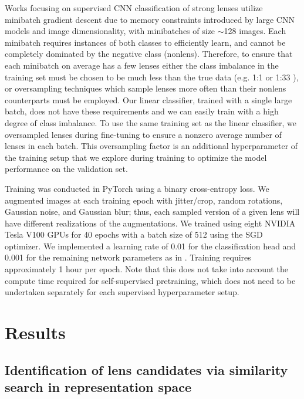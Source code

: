 \documentclass{aastex631}
\begin{document}
Works focusing on supervised CNN classification of strong lenses utilize minibatch gradient descent due to memory constraints introduced by large CNN models and image dimensionality, with minibatches of size $\sim$128 images. Each minibatch requires instances of both classes to efficiently learn, and cannot be completely dominated by the negative class (nonlens). Therefore, to ensure that each minibatch on average has a few lenses either the class imbalance in the training set must be chosen to be much less than the true data (e.g. 1:1 \citep{JacobsIII} or 1:33 \citep{HuangI}), or oversampling techniques which sample lenses more often than their nonlens counterparts must be employed. Our linear classifier, trained with a single large batch, does not have these requirements and we can easily train with a high degree of class imbalance. To use the same training set as the linear classifier, we oversampled lenses during fine-tuning to ensure a nonzero average number of lenses in each batch. This oversampling factor is an additional hyperparameter of the training setup that we explore during training to optimize the model performance on the validation set.

Training was conducted in PyTorch using a binary cross-entropy loss. We augmented images at each training epoch with jitter/crop, random rotations, Gaussian noise, and Gaussian blur; thus, each sampled version of a given lens will have different realizations of the augmentations. We trained using eight NVIDIA Tesla V100 GPUs for 40 epochs with a batch size of 512 using the SGD optimizer. We implemented a learning rate of 0.01 for the classification head and 0.001 for the remaining network parameters as in \citet{Hayat_2021}. Training requires approximately 1 hour per epoch. Note that this does not take into account the compute time required for self-supervised pretraining, which does not need to be undertaken separately for each supervised hyperparameter setup. 


\section{Results}
\label{sec:results}
\subsection{Identification of lens candidates via similarity search in representation space}
\end{document}
